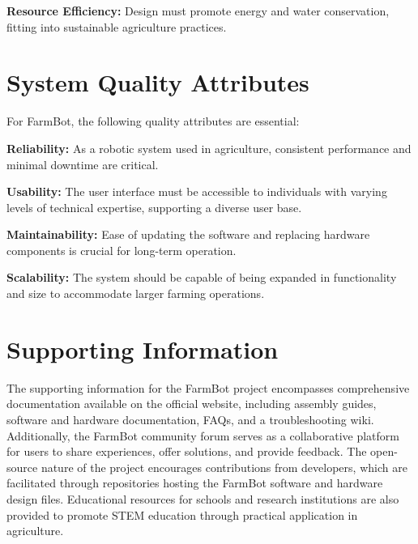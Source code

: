 \textbf{Resource Efficiency:} Design must promote energy and water conservation, fitting into sustainable agriculture practices.

\section{System Quality Attributes}
For FarmBot, the following quality attributes are essential:

\textbf{Reliability:} As a robotic system used in agriculture, consistent performance and minimal downtime are critical.

\textbf{Usability:} The user interface must be accessible to individuals with varying levels of technical expertise, supporting a diverse user base.

\textbf{Maintainability:} Ease of updating the software and replacing hardware components is crucial for long-term operation.

\textbf{Scalability:} The system should be capable of being expanded in functionality and size to accommodate larger farming operations.

\section{Supporting Information}
The supporting information for the FarmBot project encompasses comprehensive documentation available on the official website, including assembly guides, software and hardware documentation, FAQs, and a troubleshooting wiki. Additionally, the FarmBot community forum serves as a collaborative platform for users to share experiences, offer solutions, and provide feedback. The open-source nature of the project encourages contributions from developers, which are facilitated through repositories hosting the FarmBot software and hardware design files. Educational resources for schools and research institutions are also provided to promote STEM education through practical application in agriculture.



